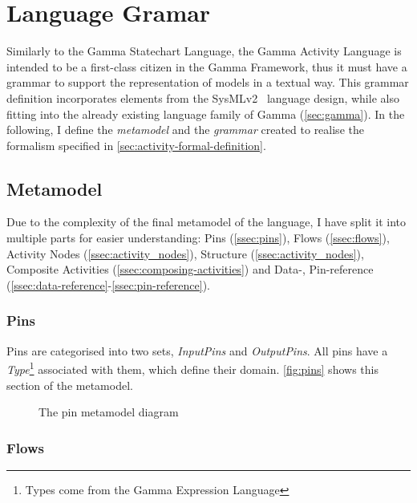 \clearpage\section{Language Gramar}\label{sec:activity-grammar}

Similarly to the Gamma Statechart Language, the Gamma Activity Language is intended to be a first-class citizen in the Gamma Framework, thus it must have a grammar to support the representation of models in a textual way. This grammar definition incorporates elements from the SysMLv2~\cite{omg_sysml_v2} language design, while also fitting into the already existing language family of Gamma (\autoref{sec:gamma}). In the following, I define the \emph{metamodel} and the \emph{grammar} created to realise the formalism specified in \autoref{sec:activity-formal-definition}.

\subsection{Metamodel}

Due to the complexity of the final metamodel of the language, I have split it into multiple parts for easier understanding: Pins (\ref{ssec:pins}), Flows (\ref{ssec:flows}), Activity Nodes  (\ref{ssec:activity_nodes}), Structure (\ref{ssec:activity_nodes}), Composite Activities (\ref{ssec:composing-activities}) and Data-, Pin-reference (\ref{ssec:data-reference}-\ref{ssec:pin-reference}).

\subsubsection*{Pins}\label{ssec:pins}

Pins are categorised into two sets, \emph{InputPins} and \emph{OutputPins}. All pins have a \emph{Type}\footnote{Types come from the Gamma Expression Language} associated with them, which define their domain. \autoref{fig:pins} shows this section of the metamodel.

\begin{figure}[!ht]
	\centering
	
	\caption{The pin metamodel diagram}
	\label{fig:pins}
\end{figure}

\subsubsection*{Flows}\label{ssec:flows}


